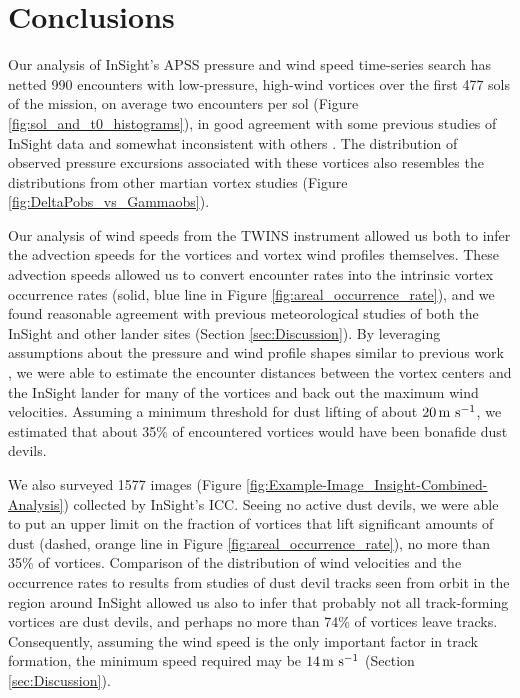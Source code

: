 \documentclass[linenumbers,trackchanges]{aastex63}
\begin{document}

\section{Conclusions}
\label{sec:Conclusions}

Our analysis of InSight's APSS pressure and wind speed time-series search has netted 990 encounters with low-pressure, high-wind vortices over the first 477 sols of the mission, on average two encounters per sol (Figure \ref{fig:sol_and_t0_histograms}), in good agreement with some previous studies of InSight data \citep{2021Icar..35514119L} and somewhat inconsistent with others \citep{2021JGRE..12606511S}. The distribution of observed pressure excursions associated with these vortices also resembles the distributions from other martian vortex studies (Figure \ref{fig:DeltaPobs_vs_Gammaobs}). 

Our analysis of wind speeds from the TWINS instrument allowed us both to infer the advection speeds for the vortices and vortex wind profiles themselves. These advection speeds allowed us to convert encounter rates into the intrinsic vortex occurrence rates (solid, blue line in Figure \ref{fig:areal_occurrence_rate}), and we found reasonable agreement with previous meteorological studies of both the InSight and other lander sites (Section \ref{sec:Discussion}). By leveraging assumptions about the pressure and wind profile shapes similar to previous work \citep{2016Icar..271..326L}, we were able to estimate the encounter distances between the vortex centers and the InSight lander for many of the vortices and back out the maximum wind velocities. Assuming a minimum threshold for dust lifting of about $20\,{\rm m\ s^{-1}}$, we estimated that about 35\% of encountered vortices would have been bonafide dust devils. 

We also surveyed 1577 images (Figure \ref{fig:Example-Image_Insight-Combined-Analysis}) collected by InSight's ICC. Seeing no active dust devils, we were able to put an upper limit on the fraction of vortices that lift significant amounts of dust (dashed, orange line in Figure \ref{fig:areal_occurrence_rate}), no more than 35\% of vortices. Comparison of the distribution of wind velocities and the occurrence rates to results from studies of dust devil tracks seen from orbit in the region around InSight \citep{2020GeoRL..4787234P} allowed us also to infer that probably not all track-forming vortices are dust devils, and perhaps no more than 74\% of vortices leave tracks. Consequently, assuming the wind speed is the only important factor in track formation, the minimum speed required may be $14\,{\rm m\ s^{-1}}$ (Section \ref{sec:Discussion}). 
\end{document}
